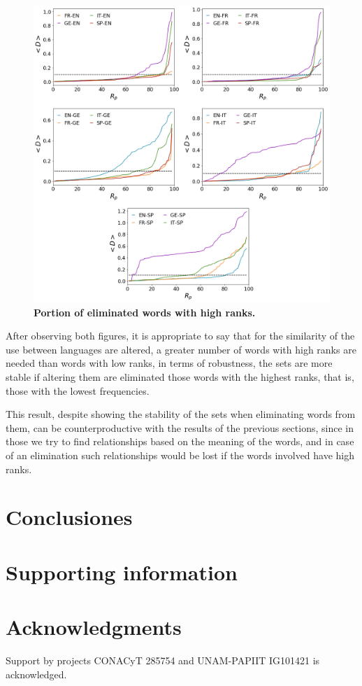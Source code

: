 \documentclass[10pt,letterpaper]{article} %
\begin{document}
\begin{figure}[!h]
	\begin{adjustwidth}{-2.5cm}{1cm}
		\centering
		\includegraphics[scale=.38]{Rp_altos.png}
		\caption{{\bf Portion of eliminated words with high ranks.} }
		\label{fig.RP_high}
	\end{adjustwidth}
\end{figure}

After observing both figures, it is appropriate to say that for the similarity of the use between languages are altered, a greater number of words with high ranks are needed than words with low ranks, in terms of robustness, the sets are more stable if altering them are eliminated those words with the highest ranks, that is, those with the lowest frequencies.

This result, despite showing the stability of the sets when eliminating words from them, can be counterproductive with the results of the previous sections, since in those we try to find relationships based on the meaning of the words, and in case of an elimination such relationships would be lost if the words involved have high ranks.


\section*{Conclusiones} %
\section*{Supporting information} %
\section*{Acknowledgments} %

\nolinenumbers

Support by projects CONACyT 285754 and UNAM-PAPIIT IG101421 is acknowledged. 
% 
 
\end{document}
